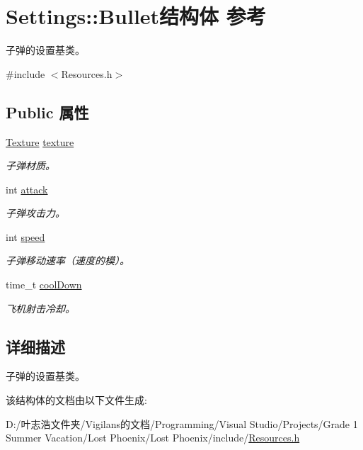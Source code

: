 \hypertarget{struct_settings_1_1_bullet}{}\section{Settings\+:\+:Bullet结构体 参考}
\label{struct_settings_1_1_bullet}


子弹的设置基类。  




{\ttfamily \#include $<$Resources.\+h$>$}

\subsection*{Public 属性}
\begin{DoxyCompactItemize}
\item 
\mbox{\label{struct_settings_1_1_bullet_a274a4b14c0bfaa540c5e60c273567bbd}} 
\hyperlink{struct_texture}{Texture} \hyperlink{struct_settings_1_1_bullet_a274a4b14c0bfaa540c5e60c273567bbd}{texture}
\begin{DoxyCompactList}\small\item\em 子弹材质。 \end{DoxyCompactList}\item 
\mbox{\label{struct_settings_1_1_bullet_a21e484cc6e290496e36a68da5b1a7b76}} 
int \hyperlink{struct_settings_1_1_bullet_a21e484cc6e290496e36a68da5b1a7b76}{attack}
\begin{DoxyCompactList}\small\item\em 子弹攻击力。 \end{DoxyCompactList}\item 
\mbox{\label{struct_settings_1_1_bullet_a8969e02d4dba2f87284855e0a141f6f3}} 
int \hyperlink{struct_settings_1_1_bullet_a8969e02d4dba2f87284855e0a141f6f3}{speed}
\begin{DoxyCompactList}\small\item\em 子弹移动速率（速度的模）。 \end{DoxyCompactList}\item 
\mbox{\label{struct_settings_1_1_bullet_aea74b608868e75f9bcf93100a38f0090}} 
time\+\_\+t \hyperlink{struct_settings_1_1_bullet_aea74b608868e75f9bcf93100a38f0090}{cool\+Down}
\begin{DoxyCompactList}\small\item\em 飞机射击冷却。 \end{DoxyCompactList}\end{DoxyCompactItemize}


\subsection{详细描述}
子弹的设置基类。 



该结构体的文档由以下文件生成\+:\begin{DoxyCompactItemize}
\item 
D\+:/叶志浩文件夹/\+Vigilans的文档/\+Programming/\+Visual Studio/\+Projects/\+Grade 1 Summer Vacation/\+Lost Phoenix/\+Lost Phoenix/include/\hyperlink{_resources_8h}{Resources.\+h}\end{DoxyCompactItemize}
